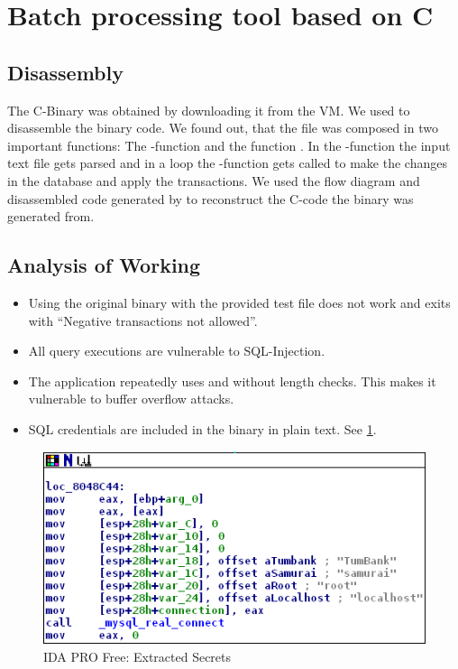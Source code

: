 \section{Batch processing tool based on C}

\subsection{Disassembly}
The C-Binary was obtained by downloading it from the VM. We used  to disassemble the binary code.
We found out, that the file was composed in two important functions: The -function and the function . In the -function the input text file gets parsed and in a loop the -function gets called to make the changes in the database and apply the transactions.
We used the flow diagram and disassembled code generated by  to reconstruct the C-code the binary was generated from.

\subsection{Analysis of Working}
\begin{itemize}
\item Using the original binary with the provided test file does not work and exits with \enquote{Negative transactions not allowed}.
\item All query executions are vulnerable to SQL-Injection.
\item The application repeatedly uses  and  without length checks. This makes it vulnerable to buffer overflow attacks.
\item SQL credentials are included in the binary in plain text. See \ref{fig:ida_db_info2}.
\end{itemize}

\begin{figure}[ht]
	\centering
	\includegraphics[width=.8\linewidth]{figures/ida_db_info.png}
	\caption{IDA PRO Free: Extracted Secrets}
	\label{fig:ida_db_info2}
\end{figure}
